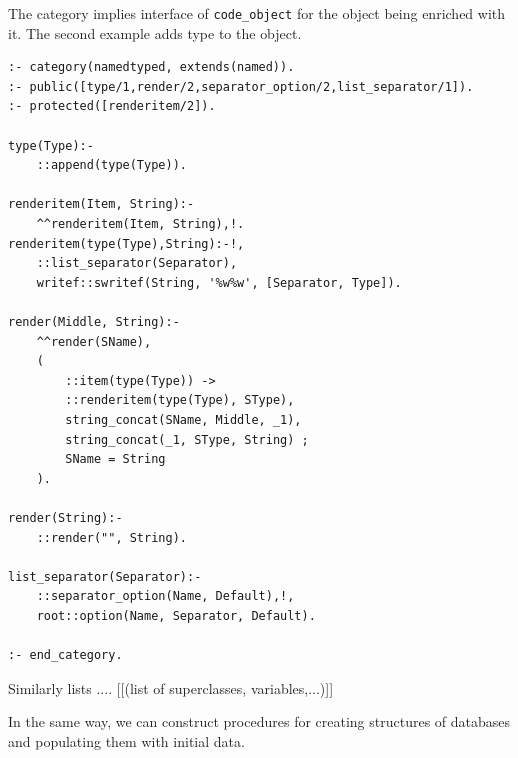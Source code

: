 \documentclass[conference]{IEEEtran}
\begin{document}
The category implies interface of \texttt{code\_object} for the object being enriched with it.  The second example adds type to the object.

\begin{verbatim}
:- category(namedtyped, extends(named)).
:- public([type/1,render/2,separator_option/2,list_separator/1]).
:- protected([renderitem/2]).

type(Type):-
    ::append(type(Type)).

renderitem(Item, String):-
    ^^renderitem(Item, String),!.
renderitem(type(Type),String):-!,
    ::list_separator(Separator),
    writef::swritef(String, '%w%w', [Separator, Type]).

render(Middle, String):-
    ^^render(SName),
    (
        ::item(type(Type)) ->
        ::renderitem(type(Type), SType),
        string_concat(SName, Middle, _1),
        string_concat(_1, SType, String) ;
        SName = String
    ).

render(String):-
    ::render("", String).

list_separator(Separator):-
    ::separator_option(Name, Default),!,
    root::option(Name, Separator, Default).

:- end_category.
\end{verbatim}

Similarly lists .... [[(list of superclasses, variables,...)]]

In the same way, we can construct procedures for creating structures of databases and populating them with initial data.


\end{document}
